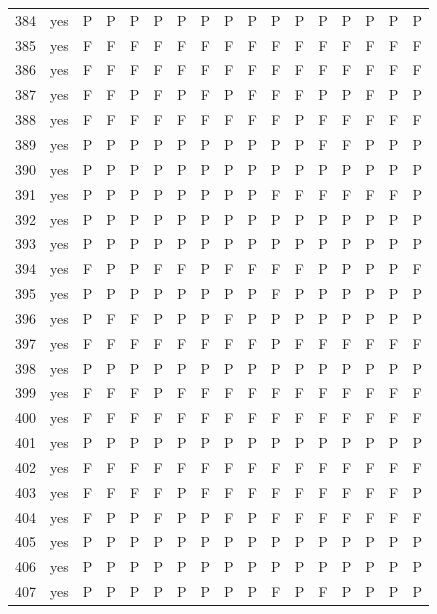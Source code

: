 \begin{table}[p]
\begin{tabular*}{\textwidth}{@{\extracolsep{\fill}}rcccccccccccccccc}
384 & yes & P & P & P & P & P & P & P & P & P & P & P & P & P & P & P\\
385 & yes & F & F & F & F & F & F & F & F & F & F & F & F & F & F & F\\
386 & yes & F & F & F & F & F & F & F & F & F & F & F & F & F & F & F\\
387 & yes & F & F & P & F & P & F & P & F & F & F & P & P & F & P & P\\
388 & yes & F & F & F & F & F & F & F & F & F & P & F & F & F & F & F\\
389 & yes & P & P & P & P & P & P & P & P & P & P & F & F & P & P & P\\
390 & yes & P & P & P & P & P & P & P & P & P & P & P & P & P & P & P\\
391 & yes & P & P & P & P & P & P & P & P & F & F & F & F & F & F & P\\
392 & yes & P & P & P & P & P & P & P & P & P & P & P & P & P & P & P\\
393 & yes & P & P & P & P & P & P & P & P & P & P & P & P & P & P & P\\
394 & yes & F & P & P & F & F & P & F & F & F & F & P & P & P & P & F\\
395 & yes & P & P & P & P & P & P & P & P & F & P & P & P & P & P & P\\
396 & yes & P & F & F & P & P & P & F & P & P & P & P & P & P & P & P\\
397 & yes & F & F & F & F & F & F & F & F & P & F & F & F & F & F & F\\
398 & yes & P & P & P & P & P & P & P & P & P & P & P & P & P & P & P\\
399 & yes & F & F & F & P & F & F & F & F & F & F & F & F & F & F & F\\
400 & yes & F & F & F & F & F & F & F & F & F & F & F & F & F & F & F\\
401 & yes & P & P & P & P & P & P & P & P & P & P & P & P & P & P & P\\
402 & yes & F & F & F & F & F & F & F & F & F & F & F & F & F & F & F\\
403 & yes & F & F & F & F & P & F & F & F & F & F & F & F & F & F & P\\
404 & yes & F & P & P & F & P & P & F & P & F & F & F & F & F & F & F\\
405 & yes & P & P & P & P & P & P & P & P & P & P & P & P & P & P & P\\
406 & yes & P & P & P & P & P & P & P & P & P & P & P & P & P & P & P\\
407 & yes & P & P & P & P & P & P & P & P & F & P & F & P & P & P & P\\
\bottomrule\end{tabular*}\end{table}
\clearpage

